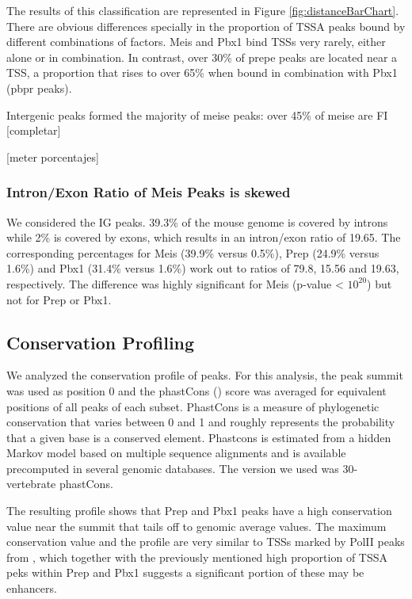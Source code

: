 The results of this classification are represented in Figure \ref{fig:distanceBarChart}. There are obvious differences specially in the proportion of \ac{TSSA} peaks bound by different combinations of factors. Meis and Pbx1 bind \acp{TSS} very rarely, either alone or in combination. In contrast, over 30\% of \ac{prepe} peaks are located near a \ac{TSS}, a proportion that rises to over 65\% when bound in combination with Pbx1 (\ac{pbpr} peaks).

Intergenic peaks formed the majority of \ac{meise} peaks: over 45\% of \ac{meise} are \ac{FI} [completar]

[meter porcentajes]

\subsubsection{Intron/Exon Ratio of Meis Peaks is skewed}

We considered the \ac{IG} peaks. 39.3\% of the mouse genome is covered by introns while 2\% is covered by exons, which results in an intron/exon ratio of 19.65. The corresponding percentages for Meis (39.9\% versus 0.5\%), Prep (24.9\% versus 1.6\%) and Pbx1 (31.4\% versus 1.6\%) work out to ratios of 79.8, 15.56 and 19.63, respectively. The difference was highly significant for Meis (p-value < $10^20$) but not for Prep or Pbx1. 


\subsection{Conservation Profiling}

We analyzed the conservation profile of peaks. For this analysis, the peak summit was used as position 0 and the phastCons (\cite{Siepel2005}) score was averaged for equivalent positions of all peaks of each subset. PhastCons is a measure of phylogenetic conservation that varies between 0 and 1 and roughly represents the probability that a given base is a conserved element. Phastcons is estimated from a hidden Markov model based on multiple sequence alignments and is available precomputed in several genomic databases. The version we used was 30-vertebrate phastCons.

The resulting profile shows that Prep and Pbx1 peaks have a high conservation value near the summit that tails off to genomic average values. The maximum conservation value and the profile are very similar to \acp{TSS} marked by \ac{PolII} peaks from \cite{Mahony2011}, which together with the previously mentioned high proportion of \ac{TSSA} peks within Prep and Pbx1 suggests a significant portion of these may be enhancers.

